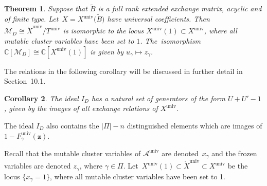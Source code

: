 \documentclass[pdftex]{sigma}%
\def\C{{\mathbb C}}
\def\A{{\mathcal{A}}}
\def\Xo{{\mathring{X}}}
\def\univ{{\operatorname{univ}}}
\def\tB{{\tilde B}}
\def\M{{\mathcal{M}}}
\def\tB{{\tilde B}}
\def\z{{\mathbf z}}
\numberwithin{equation}{section}
\newtheorem{Theorem}{Theorem}[section]
\newtheorem{Corollary}[Theorem]{Corollary}
\begin{document}
\begin{Theorem}\label{thm:univ}
Suppose that $\tB$ is a full rank extended exchange matrix, acyclic and of finite type. Let~$X= X^\univ\big(\tB\big)$ have universal coefficients. Then $\M_D \cong \Xo^\univ/T^\univ$ is isomorphic to the locus $X^\univ(1) \subset X^\univ$, where all mutable cluster variables have been set to $1$. The~isomorphism $\C[\M_D] \cong \C[X^\univ(1)]$ is given by $u_\gamma \mapsto z_\gamma$.
\end{Theorem}

\bigskip{}
The relations in the following corollary will be discussed in further detail in Section~10.1.
\begin{Corollary}\label{cor:ext}
The ideal $I_D$ has a natural set of generators of the form $U + U' - 1$, given by the images of all exchange relations of $X^\univ$. \end{Corollary}
The ideal $I_D$ also contains the $|\Pi|-n$ distinguished elements which are images of $1 - F^\univ_\gamma(\z)$.

\bigskip{} %
Recall that the mutable cluster variables of $\A^\univ$ are denoted~$x_\gamma$ and the frozen variables are denoted $z_\gamma$, where $\gamma \in \Pi$. Let~$X^\univ(1) \subset \Xo^\univ \subset X^\univ$ be the locus $\{x_\gamma = 1\}$, where all mutable cluster variables have been set to 1.
\end{document}
